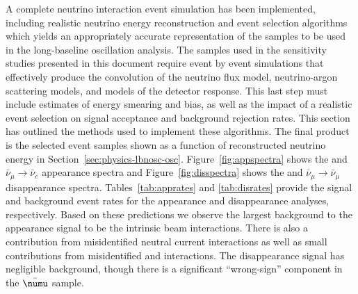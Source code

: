 A complete neutrino interaction event simulation has been implemented, including realistic neutrino energy reconstruction and event selection algorithms which yields an appropriately accurate representation of the  samples to be used in the long-baseline oscillation analysis. The samples used in the sensitivity studies presented in this document require event by event simulations that effectively produce the convolution of the neutrino flux model, neutrino-argon scattering models, and models of the detector response. This last step must include estimates of energy smearing and bias, as well as the impact of a realistic event selection on signal acceptance and background rejection rates. This section has outlined the methods used to implement these algorithms. The final product is the  selected  event samples shown as a function of reconstructed neutrino energy in Section~\ref{sec:physics-lbnosc-osc}. Figure~\ref{fig:appspectra} shows the \numutonue and $\bar{\nu}_\mu \to \bar{\nu}_e$ appearance spectra and Figure~\ref{fig:disspectra} shows the \numutonumu and  $\bar{\nu}_\mu \to \bar{\nu}_\mu$ disappearance spectra. Tables~\ref{tab:apprates} and \ref{tab:disrates} provide the signal and background event rates for the appearance and disappearance analyses, respectively. Based on these predictions we observe the largest background to the \nue {} appearance signal to be the intrinsic beam \nue interactions. There is also a contribution from misidentified neutral current interactions as well as small contributions from misidentified \numu and \nutau interactions. The \numu disappearance signal has negligible background, though there is a significant ``wrong-sign''  \numu component in the $\bar{\numu}$ sample. %


